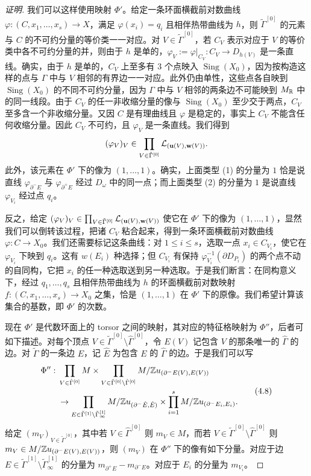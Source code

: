 \begin{proof}[证明]
我们可以这样使用映射 $\Phi'$。给定一条环面横截前对数曲线 $\varphi:(C,x_1,\dots,x_s)\to X$，满足 $\varphi(x_i)=q_i$ 且相伴热带曲线为 $h$，则 $\tilde\Gamma^{[0]}$ 的元素与 $C$ 的不可约分量的等价类一一对应。对 $V\in\tilde\Gamma^{[0]}$，若 $C_V$ 表示对应于 $V$ 的等价类中各不可约分量的并，则由于 $h$ 是单的，$\varphi_V:=\varphi|_{C_V}:C_V\to D_{h(V)}$ 是一条直线。确实，由于 $h$ 是单的，$C_V$ 上至多有 $3$ 个点映入 $\operatorname{Sing}(X_0)$，因为按构造这样的点与 $\Gamma$ 中与 $V$ 相邻的有界边一一对应。此外仍由单性，这些点各自映到 $\operatorname{Sing}(X_0)$ 的不同不可约分量，因为 $\Gamma$ 中与 $V$ 相邻的两条边不可能映到 $M_{\mathbb{R}}$ 中的同一线段。由于 $C_V$ 的任一非收缩分量的像与 $\operatorname{Sing}(X_0)$ 至少交于两点，$C_V$ 至多含一个非收缩分量。又因 $C$ 是有理曲线且 $\varphi$ 是稳定的，事实上 $C_V$ 不能含任何收缩分量。因此 $C_V$ 不可约，且 $\varphi_V$ 是一条直线。我们得到
\[
(\varphi_V)_V\in\prod_{V\in\tilde\Gamma^{[0]}}\mathcal{L}_{(\mathbf{u}(V),\mathbf{w}(V))}.
\]
此外，该元素在 $\Phi'$ 下的像为 $(1,\dots,1)$。确实，上面类型 (1) 的分量为 $1$ 恰是说直线 $\varphi_{\partial^-E}$ 与 $\varphi_{\partial^+E}$ 经过 $D_\omega$ 中的同一点；而上面类型 (2) 的分量为 $1$ 是说直线 $\varphi_{V_i}$ 经过点 $q_i$。

反之，给定 $(\varphi_V)_V\in\prod_{V\in\tilde\Gamma^{[0]}}\mathcal{L}_{(\mathbf{u}(V),\mathbf{w}(V))}$ 使它在 $\Phi'$ 下的像为 $(1,\dots,1)$，显然我们可以倒转该过程，把诸 $C_V$ 粘合起来，得到一条环面横截前对数曲线 $\varphi:C\to X_0$。我们还需要标记这条曲线：对 $1\le i\le s$，选取一点 $x_i\in C_{V_i}$，使它在 $\varphi_{V_i}$ 下映到 $q_i$。这有 $w(E_i)$ 种选择；但 $C_{V_i}$ 有保持 $\varphi_{V_i}^{-1}(\partial D_{P_i})$ 的两个点不动的自同构，它把 $x_i$ 的任一种选取送到另一种选取。于是我们断言：在同构意义下，经过 $q_1,\dots,q_s$ 且相伴热带曲线为 $h$ 的环面横截前对数映射 $f:(C,x_1,\dots,x_s)\to X_0$ 之集，恰是 $(1,\dots,1)$ 在 $\Phi'$ 下的原像。我们希望计算该集合的基数，即 $\Phi'$ 的次数。

现在 $\Phi'$ 是代数环面上的 torsor 之间的映射，其对应的特征格映射为 $\Phi''$，后者可如下描述。对每个顶点 $V\in\tilde\Gamma^{[0]}\setminus\hat\Gamma^{[0]}$，令 $E(V)$ 记包含 $V$ 的那条唯一的 $\hat\Gamma$ 的边。对 $\tilde\Gamma$ 的一条边 $E$，记 $\hat E$ 为包含 $E$ 的 $\hat\Gamma$ 的边。于是我们可以写
\begin{equation}
\begin{aligned}
\Phi'':{}&\prod_{V\in\hat\Gamma^{[0]}}M\times\prod_{V\in\tilde\Gamma^{[0]}\setminus\hat\Gamma^{[0]}}M/\mathbb{Z} u_{(\partial^-E(V),E(V))}\\
&\to\prod_{E\in\tilde\Gamma^{[1]}\setminus\tilde\Gamma^{[1]}_\infty}M/\mathbb{Z} u_{(\partial^-\hat E,\hat E)}\times\prod_{i=1}^sM/\mathbb{Z} u_{(\partial^-E_i,E_i)}.
\end{aligned}
\tag{4.8}
\end{equation}
给定 $(m_V)_{V\in\tilde\Gamma^{[0]}}$，其中若 $V\in\hat\Gamma^{[0]}$ 则 $m_V\in M$，而若 $V\in\tilde\Gamma^{[0]}\setminus\hat\Gamma^{[0]}$ 则 $m_V\in M/\mathbb{Z} u_{(\partial^-E(V),E(V))}$，则 $(m_V)$ 在 $\Phi''$ 下的像有如下分量。对应于边 $E\in\tilde\Gamma^{[1]}\setminus\tilde\Gamma^{[1]}_\infty$ 的分量为 $m_{\partial^+E}-m_{\partial^-E}$。对应于 $E_i$ 的分量为 $m_{V_i}$。


\end{proof}
